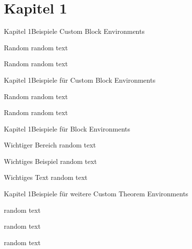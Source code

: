 

\if{}\section{Kapitel 1}\fi

\begin{frame}[label={kapitel1}]{Kapitel 1}{Beispiele Custom Block Environments}
  \begin{custom}{Random}
    random text
  \end{custom}

  \begin{acustom}{Random}
    random text
  \end{acustom}
\end{frame}

\begin{frame}{Kapitel 1}{Beispiele für Custom Block Environments}
  \begin{custom}{Random}
    random text
  \end{custom}

  \begin{acustom}{Random}
    random text
  \end{acustom}
\end{frame}

\begin{frame}{Kapitel 1}{Beispiele für Block Environments}
  \begin{block}{Wichtiger Bereich}
    random text
  \end{block}

  \begin{exampleblock}{Wichtiges Beispiel}
    random text
  \end{exampleblock}

  \begin{alertblock}{Wichtiges Text}
    random text
  \end{alertblock}
\end{frame}

\begin{frame}{Kapitel 1}{Beispiele für weitere Custom Theorem Environments}
  \begin{customtheorem}
    random text
  \end{customtheorem}

  \begin{subcustomtheorem}
    random text
  \end{subcustomtheorem}

  \begin{ocustomtheorem}
    random text
  \end{ocustomtheorem}
\end{frame}

